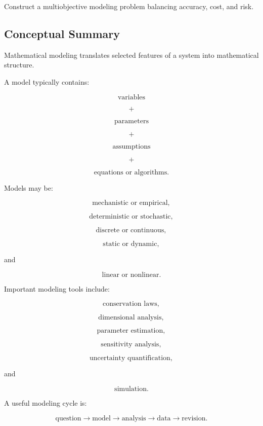 \begin{exercise}[4]
Construct a multiobjective modeling problem balancing accuracy, cost, and
risk.
\end{exercise}

\subsection{Conceptual Summary}
\label{subsec:mathematical-modeling-summary}

Mathematical modeling translates selected features of a system into
mathematical structure.

A model typically contains:

\[
\boxed{
\text{variables}
}
\]

\[
\boxed{
+
}
\]

\[
\boxed{
\text{parameters}
}
\]

\[
\boxed{
+
}
\]

\[
\boxed{
\text{assumptions}
}
\]

\[
\boxed{
+
}
\]

\[
\boxed{
\text{equations or algorithms}.
}
\]

Models may be:

\[
\boxed{
\text{mechanistic or empirical},
}
\]

\[
\boxed{
\text{deterministic or stochastic},
}
\]

\[
\boxed{
\text{discrete or continuous},
}
\]

\[
\boxed{
\text{static or dynamic},
}
\]

and

\[
\boxed{
\text{linear or nonlinear}.
}
\]

Important modeling tools include:

\[
\boxed{
\text{conservation laws},
}
\]

\[
\boxed{
\text{dimensional analysis},
}
\]

\[
\boxed{
\text{parameter estimation},
}
\]

\[
\boxed{
\text{sensitivity analysis},
}
\]

\[
\boxed{
\text{uncertainty quantification},
}
\]

and

\[
\boxed{
\text{simulation}.
}
\]

A useful modeling cycle is:

\[
\boxed{
\text{question}
\rightarrow
\text{model}
\rightarrow
\text{analysis}
\rightarrow
\text{data}
\rightarrow
\text{revision}.
}
\]

